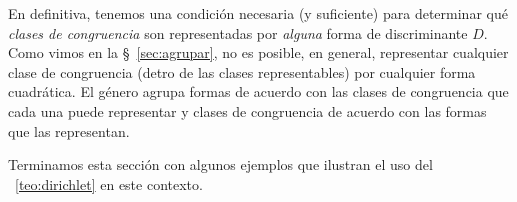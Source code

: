 En definitiva, tenemos una condici\'on necesaria (y suficiente)
para determinar qu\'e \emph{clases de congruencia} son representadas
por \emph{alguna} forma de discriminante $D$.
Como vimos en la \S~\ref{sec:agrupar}, no es posible, en general,
representar cualquier clase de congruencia (detro de las clases
representables) por cualquier forma cuadr\'atica.
El g\'enero agrupa formas de acuerdo con las clases de
congruencia que cada una puede representar y clases de congruencia
de acuerdo con las formas que las representan.

Terminamos esta secci\'on con algunos ejemplos que ilustran
el uso del \teoname~\ref{teo:dirichlet} en este contexto.

